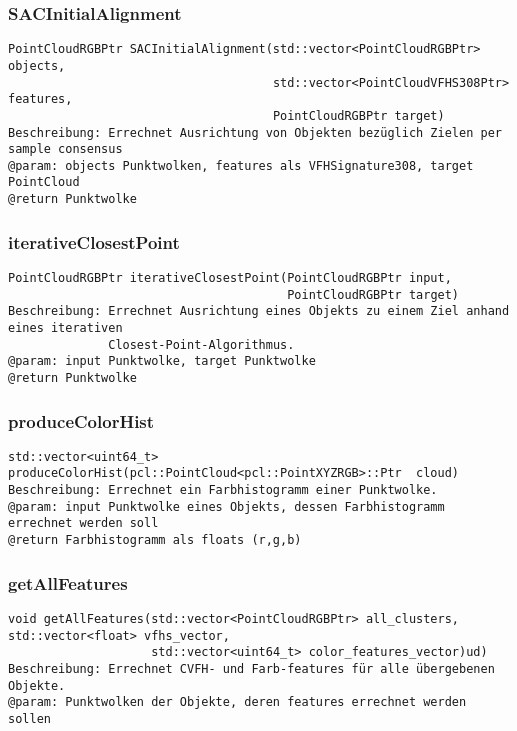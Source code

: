 \documentclass{suturo}
\begin{document}
\subsubsection{SACInitialAlignment}
\begin{verbatim}
PointCloudRGBPtr SACInitialAlignment(std::vector<PointCloudRGBPtr> objects,
                                     std::vector<PointCloudVFHS308Ptr> features,
                                     PointCloudRGBPtr target)
Beschreibung: Errechnet Ausrichtung von Objekten bezüglich Zielen per sample consensus
@param: objects Punktwolken, features als VFHSignature308, target PointCloud
@return Punktwolke
\end{verbatim}\label{func:sacinitialalignment}

\subsubsection{iterativeClosestPoint}
\begin{verbatim}
PointCloudRGBPtr iterativeClosestPoint(PointCloudRGBPtr input,
                                       PointCloudRGBPtr target)
Beschreibung: Errechnet Ausrichtung eines Objekts zu einem Ziel anhand eines iterativen 
			  Closest-Point-Algorithmus.
@param: input Punktwolke, target Punktwolke
@return Punktwolke
\end{verbatim}\label{func:iterativeClosestPoint}

\subsubsection{produceColorHist}
\begin{verbatim}
std::vector<uint64_t> produceColorHist(pcl::PointCloud<pcl::PointXYZRGB>::Ptr  cloud)
Beschreibung: Errechnet ein Farbhistogramm einer Punktwolke.
@param: input Punktwolke eines Objekts, dessen Farbhistogramm errechnet werden soll
@return Farbhistogramm als floats (r,g,b)
\end{verbatim}\label{func:produceColorHist}

\subsubsection{getAllFeatures}
\begin{verbatim}
void getAllFeatures(std::vector<PointCloudRGBPtr> all_clusters, std::vector<float> vfhs_vector,
                    std::vector<uint64_t> color_features_vector)ud)
Beschreibung: Errechnet CVFH- und Farb-features für alle übergebenen Objekte.
@param: Punktwolken der Objekte, deren features errechnet werden sollen
\end{verbatim}\label{func:getallfeatures}
\end{document}
